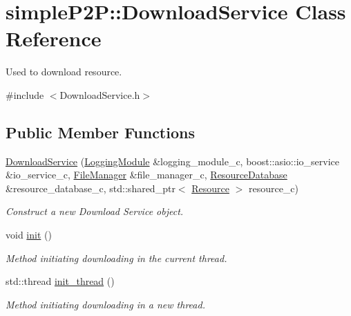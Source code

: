 \hypertarget{classsimpleP2P_1_1DownloadService}{}\section{simple\+P2P\+:\+:Download\+Service Class Reference}
\label{classsimpleP2P_1_1DownloadService}


Used to download resource.  




{\ttfamily \#include $<$Download\+Service.\+h$>$}

\subsection*{Public Member Functions}
\begin{DoxyCompactItemize}
\item 
\hyperlink{classsimpleP2P_1_1DownloadService_a3d0394fd9f3c7a954ad3dbe6249fbf42}{Download\+Service} (\hyperlink{classsimpleP2P_1_1LoggingModule}{Logging\+Module} \&logging\+\_\+module\+\_\+c, boost\+::asio\+::io\+\_\+service \&io\+\_\+service\+\_\+c, \hyperlink{classsimpleP2P_1_1FileManager}{File\+Manager} \&file\+\_\+manager\+\_\+c, \hyperlink{classsimpleP2P_1_1ResourceDatabase}{Resource\+Database} \&resource\+\_\+database\+\_\+c, std\+::shared\+\_\+ptr$<$ \hyperlink{classsimpleP2P_1_1Resource}{Resource} $>$ resource\+\_\+c)
\begin{DoxyCompactList}\small\item\em Construct a new Download Service object. \end{DoxyCompactList}\item 
\mbox{\label{classsimpleP2P_1_1DownloadService_ab16e0deab0bba9b03a251a3ff5af114c}} 
void \hyperlink{classsimpleP2P_1_1DownloadService_ab16e0deab0bba9b03a251a3ff5af114c}{init} ()
\begin{DoxyCompactList}\small\item\em Method initiating downloading in the current thread. \end{DoxyCompactList}\item 
std\+::thread \hyperlink{classsimpleP2P_1_1DownloadService_a420979e6932be2f09bcc2b34e7ac8b7a}{init\+\_\+thread} ()
\begin{DoxyCompactList}\small\item\em Method initiating downloading in a new thread. \end{DoxyCompactList}\end{DoxyCompactItemize}


